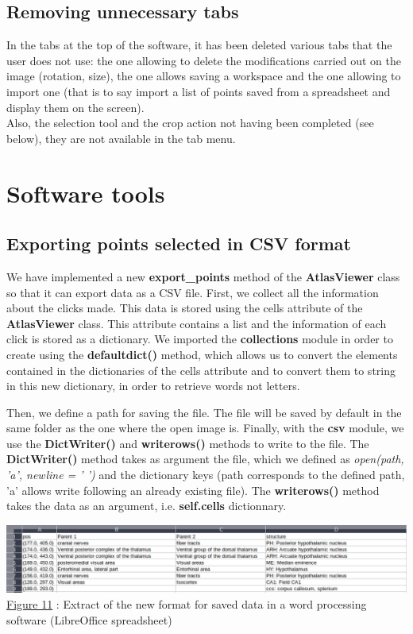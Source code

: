 \documentclass[a4paper,12pt]{report}
\begin{document}
\subsection{Removing unnecessary tabs}
In the tabs at the top of the software, it has been deleted various tabs that the user does not use: the one allowing to delete the modifications carried out on the image (rotation, size), the one allows saving a workspace and the one allowing to import one (that is to say import a list of points saved from a spreadsheet and display them on the screen).\\
\indent Also, the selection tool and the crop action not having been completed (see below), they are not available in the tab menu.\\

\section{Software tools}
\subsection{Exporting points selected in CSV format}
We have implemented a new \textbf{export\_points} method of the \textbf{AtlasViewer} class so that it can export data as a CSV file. First, we collect all the information about the clicks made. This data is stored using the cells attribute of the \textbf{AtlasViewer} class. This attribute contains a list and the information of each click is stored as a dictionary. We imported the \textbf{collections} module in order to create using the \textbf{defaultdict()} method, which allows us to convert the elements contained in the dictionaries of the cells attribute and to convert them to string in this new dictionary, in order to retrieve words not letters. 

Then, we define a path for saving the file. The file will be saved by default in the same folder as the one where the open image is. Finally, with the \textbf{csv} module, we use the \textbf{DictWriter()} and \textbf{writerows()} methods to write to the file. The \textbf{DictWriter()} method takes as argument the file, which we defined as \textit{open(path, 'a', newline = ' ')} and the dictionary keys (path corresponds to the defined path, 'a' allows write following an already existing file). The \textbf{writerows()} method takes the data as an argument, i.e. \textbf{self.cells} dictionnary.\\

\begin{center} \includegraphics[scale=0.45]{newOutputCSV.png}\\
\underline{Figure 11} : Extract of the new format for saved data in a word processing software (LibreOffice spreadsheet) \vspace{1\baselineskip}\\ \end{center}
\end{document}
